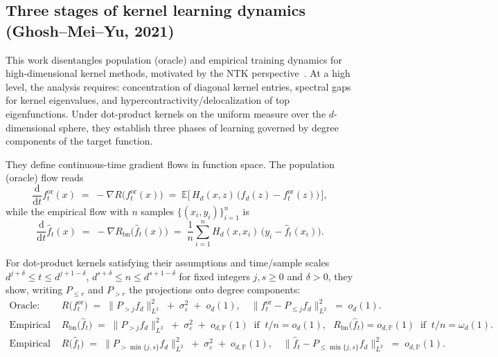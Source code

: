 \documentclass[12pt]{article}
\begin{document}
\subsection{Three stages of kernel learning dynamics (Ghosh--Mei--Yu, 2021)}\label{sec:gmystages}
This work disentangles population (oracle) and empirical training dynamics for high-dimensional kernel methods, motivated by the NTK perspective~\cite{ghosh2021stageslearningdynamicshighdimensional}. At a high level, the analysis requires: concentration of diagonal kernel entries, spectral gaps for kernel eigenvalues, and hypercontractivity/delocalization of top eigenfunctions. Under dot-product kernels on the uniform measure over the \(d\)-dimensional sphere, they establish three phases of learning governed by degree components of the target function.

They define continuous-time gradient flows in function space. The population (oracle) flow reads
\begin{equation}\label{eq:oracle-flow}
\frac{\mathrm{d}}{\mathrm{d}t} f^{\mathrm{or}}_{t}(x) \;=\; -\nabla R\big(f^{\mathrm{or}}_{t}(x)\big) \;=\; \mathbb{E}\big[\, H_{d}(x,z)\,\big(f_{d}(z) - f^{\mathrm{or}}_{t}(z)\big)\,\big],
\end{equation}
while the empirical flow with \(n\) samples \(\{(x_{i},y_{i})\}_{i=1}^{n}\) is
\begin{equation}\label{eq:empirical-flow}
\frac{\mathrm{d}}{\mathrm{d}t} \widehat{f}_{t}(x) \;=\; -\nabla R_{\mathrm{bn}}\big(\widehat{f}_{t}(x)\big) \;=\; \frac{1}{n}\sum_{i=1}^{n} H_{d}(x,x_{i})\,\big(y_{i} - \widehat{f}_{t}(x_{i})\big).
\end{equation}

For dot-product kernels satisfying their assumptions and time/sample scales \(d^{j+\delta} \le t \le d^{j+1-\delta}\), \(d^{s+\delta} \le n \le d^{s+1-\delta}\) for fixed integers \(j,s\ge 0\) and \(\delta>0\), they show, writing \(P_{\le r}\) and \(P_{> r}\) the projections onto degree components:
\begin{align}
\text{Oracle: } & R\big(f^{\mathrm{or}}_{t}\big) \;=\; \|P_{>j} f_{d}\|_{L^{2}}^{2} \;+\; \sigma_{\varepsilon}^{2} \;+\; o_{d}(1), \quad \big\| f^{\mathrm{or}}_{t} - P_{\le j} f_{d}\big\|_{L^{2}}^{2} \;=\; o_{d}(1).\label{eq:oracle-stage} \\
\text{Empirical train: } & R_{\mathrm{bn}}\big(\widehat{f}_{t}\big) \;=\; \|P_{>j} f_{d}\|_{L^{2}}^{2} \;+\; \sigma_{\varepsilon}^{2} \;+\; o_{d,\mathbb{P}}(1)\ \text{ if }\ t/n = o_{d}(1),\ \ \ R_{\mathrm{bn}}\big(\widehat{f}_{t}\big) = o_{d,\mathbb{P}}(1)\ \text{ if }\ t/n = \omega_{d}(1).\label{eq:emp-train} \\
\text{Empirical test: } & R\big(\widehat{f}_{t}\big) \;=\; \|P_{>\min\{j,s\}} f_{d}\|_{L^{2}}^{2} \;+\; \sigma_{\varepsilon}^{2} \;+\; o_{d,\mathbb{P}}(1), \quad \big\| \widehat{f}_{t} - P_{\le \min\{j,s\}} f_{d}\big\|_{L^{2}}^{2} \;=\; o_{d,\mathbb{P}}(1).\label{eq:emp-test}
\end{align}
\end{document}
